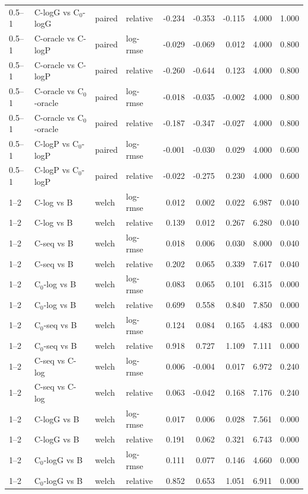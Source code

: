 \begin{longtable}{llllrrrrr}
0.5–1 & C-logG vs C$_0$-logG & paired & relative & -0.234 & -0.353 & -0.115 & 4.000 & 1.000 \\
0.5–1 & C-oracle vs C-logP & paired & log-rmse & -0.029 & -0.069 & 0.012 & 4.000 & 0.800 \\
0.5–1 & C-oracle vs C-logP & paired & relative & -0.260 & -0.644 & 0.123 & 4.000 & 0.800 \\
0.5–1 & C-oracle vs C$_0$-oracle & paired & log-rmse & -0.018 & -0.035 & -0.002 & 4.000 & 0.800 \\
0.5–1 & C-oracle vs C$_0$-oracle & paired & relative & -0.187 & -0.347 & -0.027 & 4.000 & 0.800 \\
0.5–1 & C-logP vs C$_0$-logP & paired & log-rmse & -0.001 & -0.030 & 0.029 & 4.000 & 0.600 \\
0.5–1 & C-logP vs C$_0$-logP & paired & relative & -0.022 & -0.275 & 0.230 & 4.000 & 0.600 \\
1–2 & C-log vs B & welch & log-rmse & 0.012 & 0.002 & 0.022 & 6.987 & 0.040 \\
1–2 & C-log vs B & welch & relative & 0.139 & 0.012 & 0.267 & 6.280 & 0.040 \\
1–2 & C-seq vs B & welch & log-rmse & 0.018 & 0.006 & 0.030 & 8.000 & 0.040 \\
1–2 & C-seq vs B & welch & relative & 0.202 & 0.065 & 0.339 & 7.617 & 0.040 \\
1–2 & C$_0$-log vs B & welch & log-rmse & 0.083 & 0.065 & 0.101 & 6.315 & 0.000 \\
1–2 & C$_0$-log vs B & welch & relative & 0.699 & 0.558 & 0.840 & 7.850 & 0.000 \\
1–2 & C$_0$-seq vs B & welch & log-rmse & 0.124 & 0.084 & 0.165 & 4.483 & 0.000 \\
1–2 & C$_0$-seq vs B & welch & relative & 0.918 & 0.727 & 1.109 & 7.111 & 0.000 \\
1–2 & C-seq vs C-log & welch & log-rmse & 0.006 & -0.004 & 0.017 & 6.972 & 0.240 \\
1–2 & C-seq vs C-log & welch & relative & 0.063 & -0.042 & 0.168 & 7.176 & 0.240 \\
1–2 & C-logG vs B & welch & log-rmse & 0.017 & 0.006 & 0.028 & 7.561 & 0.000 \\
1–2 & C-logG vs B & welch & relative & 0.191 & 0.062 & 0.321 & 6.743 & 0.000 \\
1–2 & C$_0$-logG vs B & welch & log-rmse & 0.111 & 0.077 & 0.146 & 4.660 & 0.000 \\
1–2 & C$_0$-logG vs B & welch & relative & 0.852 & 0.653 & 1.051 & 6.911 & 0.000 \\

\end{longtable}
